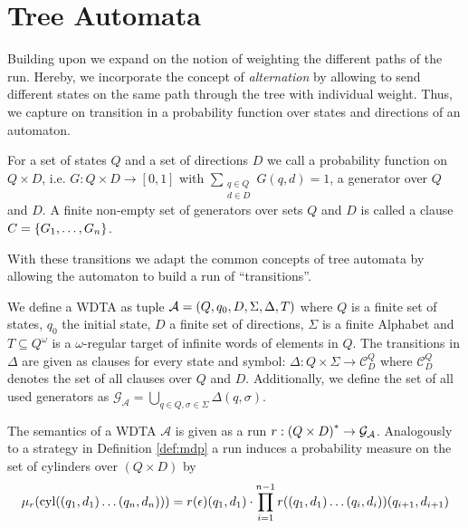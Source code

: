 \section{Tree Automata}
Building upon \cite{RandAutoInfTrees} we expand on the notion of weighting
the different paths of the run. Hereby, we incorporate the concept of
\emph{alternation} by allowing to send different states on the same path
through the tree with individual weight. Thus, we capture on transition in a
probability function over states and directions of an automaton.
\begin{definition}[Generator]
  For a set of states $Q$ and a set of directions $D$ we call a probability
  function on $Q\times D$, i.e. $G: Q\times D\rightarrow [0,1]$ with
  $\sum\limits_{\substack{q\in Q\\ d\in D}}G(q,d) = 1$, a generator over $Q$
  and $D$. A finite non-empty set of generators over sets $Q$ and $D$ is called
  a clause $C = \left\{G_{1},\dots,G_{n}\right\}$.
\end{definition}
With these transitions we adapt the common concepts of tree automata by
allowing the automaton to build a run of \enquote{transitions}.
\begin{definition}
  We define a \acl{WDTA} as tuple
  $\mathcal{A} = \left(Q, q_{0}, D, \Sigma, \Delta, T\right)$ where $Q$ is a finite
  set of states, $q_{0}$ the initial state, $D$ a finite set of directions,
  $\Sigma$ is a finite Alphabet and $T\subseteq Q^{\omega}$ is a
  $\omega$-regular target of infinite words of elements in $Q$. The transitions
  in $\Delta$ are given as clauses for every state and symbol:
  $\Delta:Q\times\Sigma\rightarrow\mathcal{C}^{Q}_{D}$
  where $\mathcal{C}^{Q}_{D}$ denotes the set of all clauses over $Q$ and $D$.
  Additionally, we define the set of all used generators as
  $\mathcal{G}_{\mathcal{A}} = \bigcup\limits_{q\in Q,\sigma\in\Sigma}
    \Delta(q,\sigma)$.
\end{definition}
The semantics of a \ac{WDTA} $\mathcal{A}$ is given as a run
$r:\left(Q\times D\right)^{*}\rightarrow \mathcal{G}_{\mathcal{A}}$. Analogously to
a strategy in Definition \ref{def:mdp} a run induces a probability measure on
the set of cylinders over $(Q\times D)$ by
\begin{equation}
  \mu_{r}(\operatorname{cyl}(\left(q_{1},d_{1}\right)\dots\left(q_{n},d_{n}\right)))
    = r(\epsilon)(q_{1},d_{1})\cdot\prod\limits_{i = 1}^{n - 1}
    r(\left(q_{1},d_{1}\right)\dots\left(q_{i},d_{i}\right))(q_{i+1},d_{i+1})
\end{equation}
